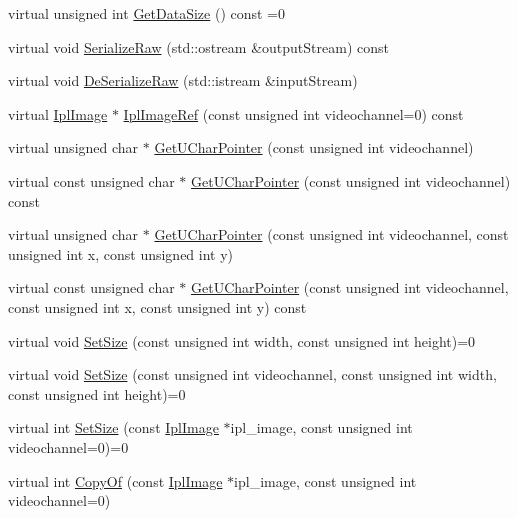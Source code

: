 \begin{DoxyCompactItemize}
\item 
virtual unsigned int \hyperlink{classsvl_sample_c_u_d_a_image_afff8663e603047c1c6362daefebf7e47}{Get\+Data\+Size} () const =0
\item 
virtual void \hyperlink{classsvl_sample_c_u_d_a_image_afa06e96bb83e21adb533a602221432dc}{Serialize\+Raw} (std\+::ostream \&output\+Stream) const 
\item 
virtual void \hyperlink{classsvl_sample_c_u_d_a_image_ab09d7cf8b648321c6906335998897797}{De\+Serialize\+Raw} (std\+::istream \&input\+Stream)
\item 
virtual \hyperlink{svl_types_8h_aa5a40a13021ba9708bfe921e18fdfa53}{Ipl\+Image} $\ast$ \hyperlink{classsvl_sample_c_u_d_a_image_a42cdc8530cd24b6cbe7215545360145c}{Ipl\+Image\+Ref} (const unsigned int videochannel=0) const 
\item 
virtual unsigned char $\ast$ \hyperlink{classsvl_sample_c_u_d_a_image_a6fa54c02d9ef41e88354dfb687d18c82}{Get\+U\+Char\+Pointer} (const unsigned int videochannel)
\item 
virtual const unsigned char $\ast$ \hyperlink{classsvl_sample_c_u_d_a_image_a07ff219ee1c51e675ccc08b0cbb86adb}{Get\+U\+Char\+Pointer} (const unsigned int videochannel) const 
\item 
virtual unsigned char $\ast$ \hyperlink{classsvl_sample_c_u_d_a_image_af56adc449e7a74bd2b8ed3be9062d757}{Get\+U\+Char\+Pointer} (const unsigned int videochannel, const unsigned int x, const unsigned int y)
\item 
virtual const unsigned char $\ast$ \hyperlink{classsvl_sample_c_u_d_a_image_a32198e02963a9aec2785c6ca76d7176d}{Get\+U\+Char\+Pointer} (const unsigned int videochannel, const unsigned int x, const unsigned int y) const 
\item 
virtual void \hyperlink{classsvl_sample_c_u_d_a_image_a8e8d4b761c82afb7cf4e08852fb9c5a5}{Set\+Size} (const unsigned int width, const unsigned int height)=0
\item 
virtual void \hyperlink{classsvl_sample_c_u_d_a_image_a692d4b96e25e3ace46f84606cffab219}{Set\+Size} (const unsigned int videochannel, const unsigned int width, const unsigned int height)=0
\item 
virtual int \hyperlink{classsvl_sample_c_u_d_a_image_a1d5c01d23b191bf16c370dd67fef6d7e}{Set\+Size} (const \hyperlink{svl_types_8h_aa5a40a13021ba9708bfe921e18fdfa53}{Ipl\+Image} $\ast$ipl\+\_\+image, const unsigned int videochannel=0)=0
\item 
virtual int \hyperlink{classsvl_sample_c_u_d_a_image_a5036280241a192db6f80feb6ca456922}{Copy\+Of} (const \hyperlink{svl_types_8h_aa5a40a13021ba9708bfe921e18fdfa53}{Ipl\+Image} $\ast$ipl\+\_\+image, const unsigned int videochannel=0)

\end{DoxyCompactItemize}
